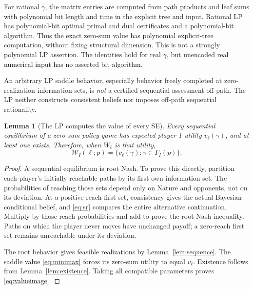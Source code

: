 \documentclass[11pt,a4paper]{article}
\numberwithin{equation}{section}
\newtheorem{lemma}[theorem]{Lemma}
\theoremstyle{definition}
\begin{document}
For rational \(\gamma\), the matrix entries are computed from path
products and leaf sums with polynomial bit length and time in the
explicit tree and input. Rational LP has polynomial-bit optimal
primal and dual certificates and a polynomial-bit algorithm.
Thus the exact zero-sum value has polynomial explicit-tree computation,
without fixing structural dimension. This is not a strongly polynomial
LP assertion. The identities hold for real \(\gamma\), but unencoded
real numerical input has no asserted bit algorithm.

An arbitrary LP saddle behavior, especially behavior freely completed
at zero-realization information sets, is \emph{not} a certified
sequential assessment off path. The LP neither constructs consistent
beliefs nor imposes off-path sequential rationality.

\begin{lemma}[The LP computes the value of every SE]\label{lem:sevalue}
Every sequential equilibrium of a zero-sum policy game has expected
player-1 utility \(v_\ell(\gamma)\), and at least one exists.
Therefore, when \(W_\ell\) is that utility,
\begin{equation}\label{eq:valueimage}
 \mathcal W_I(\ell;p)
       =\{v_\ell(\gamma):\gamma\in\Gamma_I(p)\}.
\end{equation}
\end{lemma}
\begin{proof}
A sequential equilibrium is root Nash. To prove this directly,
partition each player's initially reachable paths by its first own
information set. The probabilities of reaching those sets depend only
on Nature and opponents, not on its deviation. At a positive-reach
first set, consistency gives the actual Bayesian conditional belief,
and \eqref{eq:sr} compares the entire alternative continuation.
Multiply by those reach probabilities and add to prove the root
Nash inequality. Paths on which the player never moves have unchanged
payoff; a zero-reach first set remains unreachable under its deviation.

The root behavior gives feasible realizations by Lemma~\ref{lem:sequence}.
The saddle value \eqref{eq:minimax} forces its zero-sum utility to
equal \(v_\ell\). Existence follows from Lemma~\ref{lem:existence}.
Taking all compatible parameters proves \eqref{eq:valueimage}.
\end{proof}
\end{document}
